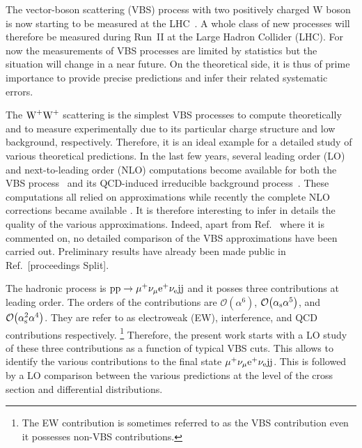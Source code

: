The vector-boson scattering (VBS) process with two positively charged W boson is now starting to be measured at the LHC~\cite{Aad:2014zda,Aaboud:2016ffv,Khachatryan:2014sta}.
A whole class of new processes will therefore be measured during Run~II at the Large Hadron Collider (LHC).
For now the measurements of VBS processes are limited by statistics but the situation will change in a near future.
On the theoretical side, it is thus of prime importance to provide precise predictions and infer their related systematic errors.

The $\text{W}^+\text{W}^+$ scattering is the simplest VBS processes to compute theoretically and to measure experimentally due to its particular charge structure and low background, respectively.
Therefore, it is an ideal example for a detailed study of various theoretical predictions.
In the last few years, several leading order (LO) and next-to-leading order (NLO) computations become available for both the VBS process~\cite{Jager:2009xx,Jager:2011ms,Denner:2012dz,Rauch:2016pai} and its QCD-induced irreducible background
process~\cite{Melia:2010bm,Melia:2011gk,Campanario:2013gea,Baglio:2014uba,Rauch:2016pai}.
These computations all relied on approximations while recently the complete NLO corrections became available \cite{Biedermann:2017bss}.
It is therefore interesting to infer in details the quality of the various approximations.
Indeed, apart from Ref.~\cite{Biedermann:2017bss} where it is commented on,  no detailed comparison of the VBS approximations have been carried out.
Preliminary results have already been made public in Ref.~[proceedings Split].

The hadronic process is ${\rm p}{\rm p}\to\mu^+\nu_\mu{\rm e}^+\nu_{\rm e}{\rm j}{\rm j}$ and it posses three contributions at leading order.
The orders of the contributions are $\mathcal{O}{\left(\alpha^{6}\right)}$, $\mathcal{O}{\left(\alpha_{\rm s}\alpha^{5}\right)}$, and $\mathcal{O}{\left(\alpha_\text{s}^{2}\alpha^{4}\right)}$.
They are refer to as electroweak (EW), interference, and QCD contributions respectively.
\footnote{The EW contribution is sometimes referred to as the VBS contribution even it possesses non-VBS contributions.}
Therefore, the present work starts with a LO study of these three contributions as a function of typical VBS cuts.
This allows to identify the various contributions to the final state $\mu^+\nu_\mu{\rm e}^+\nu_{\rm e}{\rm j}{\rm j}$.
This is followed by a LO comparison between the various predictions at the level of the cross section and differential distributions.

